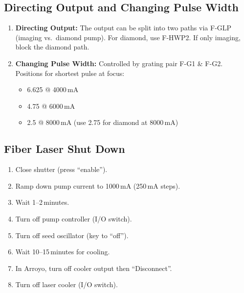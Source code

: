 \documentclass{article}
\begin{document}
\subsection{Directing Output and Changing Pulse Width}
\begin{enumerate}
  \item \textbf{Directing Output:} The output can be split into two paths via F-GLP (imaging vs.\ diamond pump). For diamond, use F-HWP2. If only imaging, block the diamond path.
  \item \textbf{Changing Pulse Width:} Controlled by grating pair F-G1 \& F-G2. Positions for shortest pulse at focus:
    \begin{itemize}
      \item 6.625 @ 4000\,mA
      \item 4.75  @ 6000\,mA
      \item 2.5   @ 8000\,mA (use 2.75 for diamond at 8000\,mA)
    \end{itemize}
\end{enumerate}

\subsection{Fiber Laser Shut Down}
\begin{enumerate}
  \item Close shutter (press ``enable'').
  \item Ramp down pump current to 1000\,mA (250\,mA steps).
  \item Wait 1--2\,minutes.
  \item Turn off pump controller (I/O switch).
  \item Turn off seed oscillator (key to ``off'').
  \item Wait 10--15\,minutes for cooling.
  \item In Arroyo, turn off cooler output then ``Disconnect''.
  \item Turn off laser cooler (I/O switch).
\end{enumerate}
\end{document}

